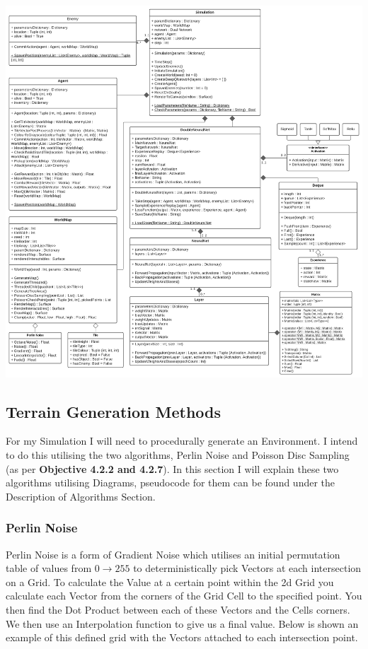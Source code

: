 \begin{flushleft}
            \pagebreak
            \vspace{0.5cm}
            \centerline{\includegraphics[width=18cm]{Images/Design/ClassDiagram.png}}
            \vspace{0.5cm}
            \pagebreak
        \subsection{Terrain Generation Methods}
            For my Simulation I will need to procedurally generate an Environment. I intend to do this utilising
            the two algorithms, Perlin Noise and Poisson Disc Sampling (as per \textbf{Objective 4.2.2 and 4.2.7}).
            In this section I will explain these two algorithms utilising Diagrams, pseudocode for them can be found under
            the Description of Algorithms Section.

            \subsubsection{Perlin Noise}
                Perlin Noise is a form of Gradient Noise which utilises an initial permutation table of values from $0\to 255$
                to deterministically pick Vectors at each intersection on a Grid. To calculate the Value at a certain point within
                the 2d Grid you calculate each Vector from the corners of the Grid Cell to the specified point. You then
                find the Dot Product between each of these Vectors and the Cells corners. We then use an Interpolation function
                to give us a final value. Below is shown an example of this defined grid with the Vectors attached to each intersection
                point. \\
                \vspace{0.5cm}


\end{flushleft}
